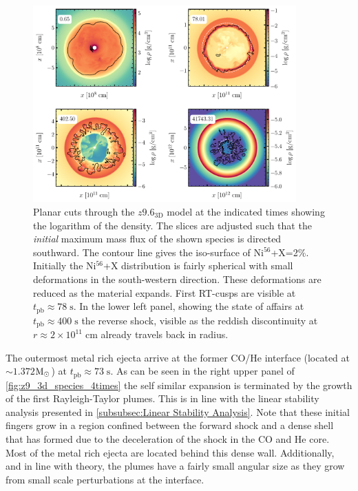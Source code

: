 \documentclass[fleqn,usenatbib]{mnras}
\newcommand{\nickel}{$\mathrm{Ni^{56}}$\xspace}
\newcommand{\tracer}{$\mathrm{X}$\xspace}
\newcommand{\solm}{\xspace\ensuremath{\rm{M_{\odot}}}}
\begin{document}
\begin{figure}
 \centering
 \includegraphics[width=0.9\textwidth]{pic/rho_cuts_z9_3d_4times.pdf}
 \caption{Planar cuts through the $z9.6_{\mathrm{3D}}$ model at the indicated times showing the logarithm of the density. The slices are adjusted such that the \textit{initial} maximum mass flux of the shown species is directed southward. The contour line gives the iso-surface of \nickel+\tracer=2\%. Initially the \nickel+\tracer distribution is fairly spherical with small deformations in the south-western direction. These deformations are reduced as the material expands. First RT-cusps are visible at $t_{\mathrm{pb}}\approx 78\;\mathrm{s}$. In the lower left panel, showing the state of affairs at  $t_{\mathrm{pb}}\approx 400\;\mathrm{s}$ the reverse shock, visible as the reddish discontinuity at $r\approx 2\times 10^{11}\;\mathrm{cm}$ already travels back in radius. }
 \label{fig:z9_3d_species_4times}
\end{figure}

The outermost metal rich ejecta arrive at the former CO/He interface (located at $\sim1.372$\solm) at $t_{\mathrm{pb}}\approx 73\;\mathrm{s}$.  As can be seen in the right upper panel of \autoref{fig:z9_3d_species_4times} the self similar expansion is terminated by the growth of the first Rayleigh-Taylor plumes. This is in line with the linear stability analysis presented in \autoref{subsubsec:Linear Stability Analysis}. Note that these initial fingers grow in a region confined between the forward shock and a dense shell that has formed due to the deceleration of the shock in the CO and He core. Most of the metal rich ejecta are located behind this dense wall. Additionally, and in line with theory, the plumes have a fairly small angular size as they grow from small scale perturbations at the interface. 
\end{document}

